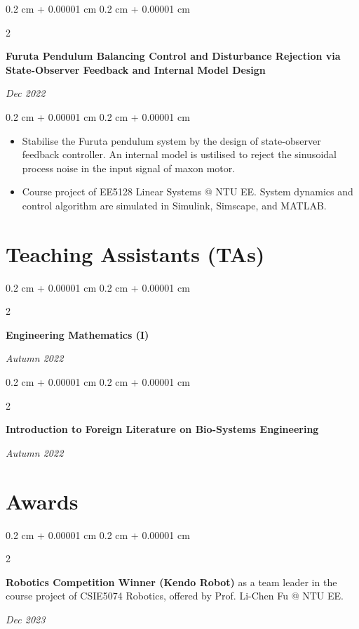 \documentclass[10pt, letterpaper]{article}
\newenvironment{highlights}{
    \begin{itemize}[
        topsep=0.10 cm,
        parsep=0.10 cm,
        partopsep=0pt,
        itemsep=0pt,
        leftmargin=0.4 cm + 10pt
    ]
}{
    \end{itemize}
} %
\newenvironment{onecolentry}{
    \begin{adjustwidth}{
        0.2 cm + 0.00001 cm
    }{
        0.2 cm + 0.00001 cm
    }
}{
    \end{adjustwidth}
} %
\newenvironment{twocolentry}[2][]{
    \onecolentry
    \def\secondColumn{#2}
    \setcolumnwidth{\fill, 4.5 cm}
    \begin{paracol}{2}
}{
    \switchcolumn \raggedleft \secondColumn
    \end{paracol}
    \endonecolentry
} %
\begin{document}
        \vspace{0.2 cm}

        \begin{twocolentry}{
        \textit{Dec 2022}}
            \textbf{Furuta Pendulum Balancing Control and Disturbance Rejection via State-Observer Feedback and Internal Model Design}
        \end{twocolentry}
        \vspace{0.10 cm}
        \begin{onecolentry}
            \begin{highlights}
                \item Stabilise the Furuta pendulum system by the design of state-observer feedback controller. An internal model is ustilised to reject the sinusoidal process noise in the input signal of maxon motor. 
                \item Course project of EE5128 Linear Systems @ NTU EE. System dynamics and control algorithm are simulated in Simulink, Simscape, and MATLAB.
            \end{highlights}
        \end{onecolentry}

    \section{Teaching Assistants (TAs)}
    
        \begin{twocolentry}{
        \textit{Autumn 2022}}
            \textbf{Engineering Mathematics (I)}
        \end{twocolentry}

        \vspace{0.2 cm}

        \begin{twocolentry}{
        \textit{Autumn 2022}}
            \textbf{Introduction to Foreign Literature on Bio-Systems Engineering}
        \end{twocolentry}
        
    \section{Awards}
    
        \begin{twocolentry}{
        \textit{Dec 2023}}
            \textbf{Robotics Competition Winner (Kendo Robot)} as a team leader in the course project of CSIE5074 Robotics, offered by Prof. Li-Chen Fu @ NTU EE.
        \end{twocolentry}
\end{document}
